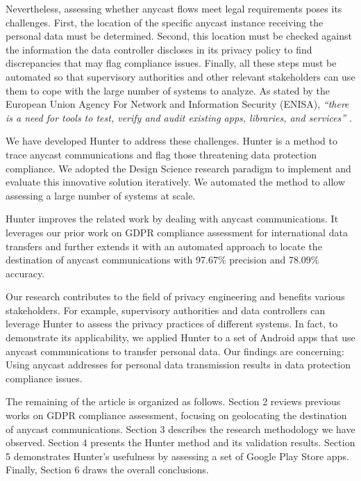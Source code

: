 \documentclass[preprint,12pt]{elsarticle}
\begin{document}
Nevertheless, assessing whether anycast flows meet legal requirements poses its challenges. First, the location of the specific anycast instance receiving the personal data must be determined. Second, this location must be checked against the information the data controller discloses in its privacy policy to find discrepancies that may flag compliance issues. Finally, all these steps must be automated so that supervisory authorities and other relevant stakeholders can use them to cope with the large number of systems to analyze. As stated by the European Union Agency For Network and Information Security (ENISA), \textit{“there is a need for tools to test, verify and audit existing apps, libraries, and services”} \cite{EuropeanUnion.AgencyforNetworkandInformationSecurity.PrivacyGDPR.}.

We have developed Hunter to address these challenges. Hunter is a method to trace anycast communications and flag those threatening data protection compliance. We adopted the Design Science research paradigm \cite{Hevner2004DesignResearch} to implement and evaluate this innovative solution iteratively. We automated the method to allow assessing a large number of systems at scale. 

Hunter improves the related work by dealing with anycast communications. It leverages our prior work on GDPR compliance assessment for international data transfers \cite{Guaman2023AutomatedApplications} and further extends it with an automated approach to locate the destination of anycast communications with 97.67\% precision and 78.09\% accuracy.

Our research contributes to the field of privacy engineering and benefits various stakeholders. For example, supervisory authorities and data controllers can leverage Hunter to assess the privacy practices of different systems. In fact, to demonstrate its applicability, we applied Hunter to a set of Android apps that use anycast communications to transfer personal data. Our findings are concerning: Using anycast addresses for personal data transmission results in data protection compliance issues. 

The remaining of the article is organized as follows. Section 2 reviews previous works on GDPR compliance assessment, focusing on geolocating the destination of anycast communications. Section 3 describes the research methodology we have observed. Section 4 presents the Hunter method and its validation results. Section 5 demonstrates Hunter's usefulness by assessing a set of Google Play Store apps. Finally, Section 6 draws the overall conclusions.
\end{document}

